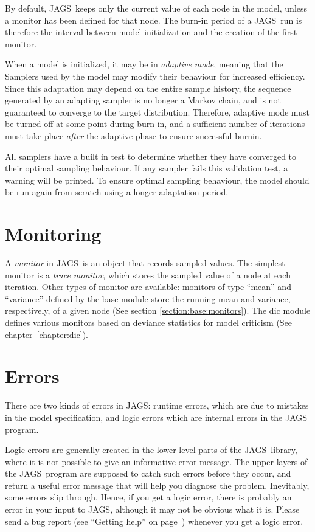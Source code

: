 \documentclass[11pt, a4paper, titlepage]{report}
\newcommand{\JAGS}{\textsf{JAGS}}
\begin{document}
By default, \JAGS\ keeps only the current value of each node in the
model, unless a monitor has been defined for that node. The burn-in
period of a \JAGS\ run is therefore the interval between model
initialization and the creation of the first monitor.

When a model is initialized, it may be in {\em adaptive mode}, meaning
that the Samplers used by the model may modify their behaviour for
increased efficiency. Since this adaptation may depend on the entire
sample history, the sequence generated by an adapting sampler is no
longer a Markov chain, and is not guaranteed to converge to the target
distribution. Therefore, adaptive mode must be turned off at some
point during burn-in, and a sufficient number of iterations must take
place {\em after} the adaptive phase to ensure successful burnin.

All samplers have a built in test to determine whether they have
converged to their optimal sampling behaviour.  If any sampler fails
this validation test, a warning will be printed. To ensure optimal
sampling behaviour, the model should be run again from scratch using a
longer adaptation period.

\section{Monitoring}
\label{section:monitoring}

A {\em monitor} in \JAGS\ is an object that records sampled
values. The simplest monitor is a {\em trace monitor}, which stores
the sampled value of a node at each iteration. Other types of monitor
are available: monitors of type ``mean'' and ``variance'' defined by
the base module store the running mean and variance, respectively,
of a given node (See section \ref{section:base:monitors}). The dic module
defines various monitors based on deviance statistics for model
criticism (See chapter~\ref{chapter:dic}).

\section{Errors}

There are two kinds of errors in \JAGS: runtime errors, which are due to
mistakes in the model specification, and logic errors which are internal
errors in the JAGS program. 

Logic errors are generally created in the lower-level parts of the
\JAGS\ library, where it is not possible to give an informative error
message.  The upper layers of the \JAGS\ program are supposed to catch
such errors before they occur, and return a useful error message that
will help you diagnose the problem.  Inevitably, some errors slip
through. Hence, if you get a logic error, there is probably an error
in your input to \JAGS, although it may not be obvious what it
is. Please send a bug report (see ``Getting help'' on
page~\pageref{section:help}) whenever you get a logic error.
\end{document}
